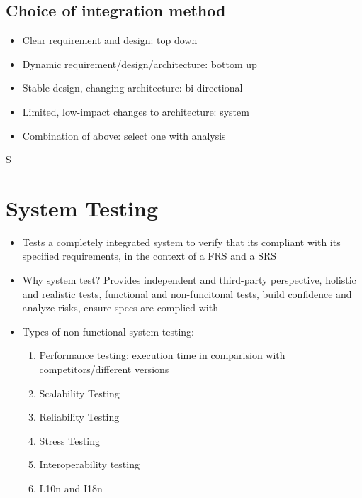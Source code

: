 \documentclass{article}
\begin{document}
\subsection{Choice of integration method}
\begin{itemize}
    \item Clear requirement and design: top down
    
    \item Dynamic requirement/design/architecture: bottom up
    
    \item Stable design, changing architecture: bi-directional
    
    \item Limited, low-impact changes to architecture: system
    
    \item Combination of above: select one with analysis
\end{itemize}S
\section{System Testing}
\begin{itemize}
    \item Tests a completely integrated system to verify that its compliant with its specified requirements, in the context of a FRS and a SRS
    
    \item Why system test? Provides independent and third-party perspective, holistic and realistic tests, functional and non-funcitonal tests, build confidence and analyze risks, ensure specs are complied with
    
    \item Types of non-functional system testing:
    \begin{enumerate}
        \item Performance testing: execution time in comparision with competitors/different versions
        
        \item Scalability Testing
        
        \item Reliability Testing
        
        \item Stress Testing
        
        \item Interoperability testing
        
        \item L10n and I18n 
    \end{enumerate}
\end{itemize}
\end{document}
